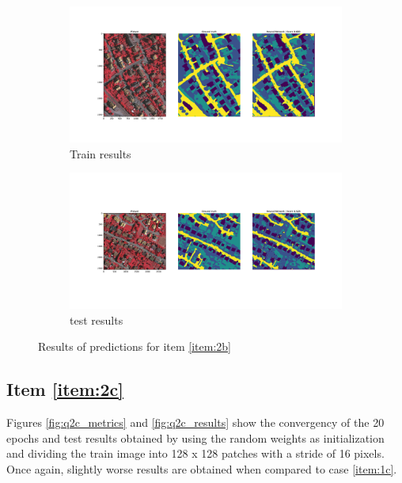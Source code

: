 \documentclass[10pt, a4paper]{article}
\begin{document}
\begin{figure}[htpb]
  \centering
  \begin{subfigure}[b]{0.45\textwidth}
      \centering
      \includegraphics[width=\textwidth]{images/Patch64_scratch_train.pdf}
      \caption{Train results}
      \label{fig:q2b_train}
  \end{subfigure}
  \hspace{0.05\textwidth}
  \begin{subfigure}[b]{0.45\textwidth}
    \centering
    \includegraphics[width=\textwidth]{images/Patch64_scratch_test.pdf}
    \caption{test results}
    \label{fig:q2b_test}
  \end{subfigure}
  \caption{Results of predictions for item \ref{item:2b}}
  \label{fig:q2b_results}
\end{figure}

\newpage
\subsection{Item \ref{item:2c}}

Figures \ref{fig:q2c_metrics} and \ref{fig:q2c_results} show the convergency of the 20 epochs and test results obtained by using the random weights as initialization 
and dividing the train image into 128 x 128 patches with a stride of 16 pixels. Once again, slightly worse results are obtained when compared to case \ref{item:1c}.
\end{document}
